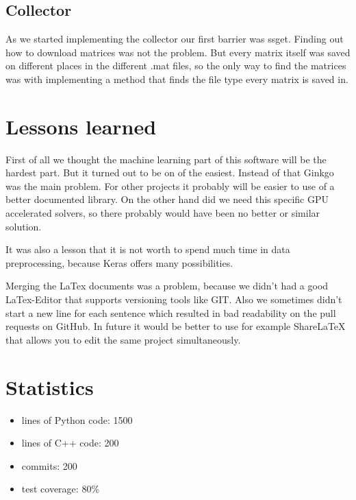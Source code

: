 \documentclass[parskip=full]{scrartcl}
\begin{document}
\subsection{Collector}
As we started implementing the \gls{collector} our first barrier was \gls{ssget}. 
Finding out how to download matrices was not the problem.
But every matrix itself was saved on different places in the different \glspl{.mat file}, so the only way to find the matrices was with implementing a method that finds the file type every matrix is saved in.

\section{Lessons learned}
First of all we thought the machine learning part of this software will be the hardest part.
But it turned out to be on of the easiest.
Instead of that \gls{Ginkgo} was the main problem.
For other projects it probably will be easier to use of a better documented library.
On the other hand did we need this specific \gls{GPU} accelerated solvers, so there probably would have been no better or similar solution.

It was also a lesson that it is not worth to spend much time in data
preprocessing, because \gls{Keras} offers many possibilities.

Merging the \gls{LaTex} documents was a problem, because we didn't had a good \gls{LaTex}-Editor that supports versioning tools like \gls{GIT}.
Also we sometimes didn't start a new line for each sentence which resulted in bad readability on the pull requests on \gls{GitHub}.
In future it would be better to use for example \gls{ShareLaTeX} that allows you to edit the same project simultaneously.

\section{Statistics}
 
\begin{itemize}

\item lines of \gls{Python} code: 1500

\item lines of \gls{C++} code: 200

\item commits: 200

\item test coverage: 80\%

\end{itemize}
\end{document}
